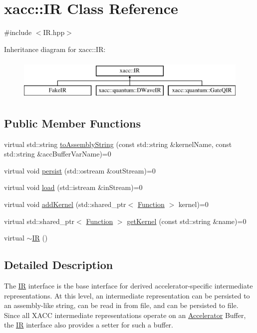 \hypertarget{a02480}{}\section{xacc\+:\+:IR Class Reference}
\label{a02480}


{\ttfamily \#include $<$I\+R.\+hpp$>$}

Inheritance diagram for xacc\+:\+:IR\+:\begin{figure}[H]
\begin{center}
\leavevmode
\includegraphics[height=2.000000cm]{a02480}
\end{center}
\end{figure}
\subsection*{Public Member Functions}
\begin{DoxyCompactItemize}
\item 
virtual std\+::string \hyperlink{a02480_a8356cdff1919b88eabeb84fd7450cdb6}{to\+Assembly\+String} (const std\+::string \&kernel\+Name, const std\+::string \&acc\+Buffer\+Var\+Name)=0
\item 
virtual void \hyperlink{a02480_a414b72224d88473ad6190bb88102a3ea}{persist} (std\+::ostream \&out\+Stream)=0
\item 
virtual void \hyperlink{a02480_a444c2e4dc0faac500fb70fa93997e9bc}{load} (std\+::istream \&in\+Stream)=0
\item 
virtual void \hyperlink{a02480_abbbf8e6993c518597de32cd05d49d737}{add\+Kernel} (std\+::shared\+\_\+ptr$<$ \hyperlink{a02456}{Function} $>$ kernel)=0
\item 
virtual std\+::shared\+\_\+ptr$<$ \hyperlink{a02456}{Function} $>$ \hyperlink{a02480_a6f49b4ba4b3a15142b04873284885f0d}{get\+Kernel} (const std\+::string \&name)=0
\item 
virtual \hyperlink{a02480_a09a76d71092254acae07e19fa2f34921}{$\sim$\+IR} ()
\end{DoxyCompactItemize}


\subsection{Detailed Description}
The \hyperlink{a02480}{IR} interface is the base interface for derived accelerator-\/specific intermediate representations. At this level, an intermediate representation can be persisted to an assembly-\/like string, can be read in from file, and can be persisted to file. Since all X\+A\+CC intermediate representations operate on an \hyperlink{a02432}{Accelerator} Buffer, the \hyperlink{a02480}{IR} interface also provides a setter for such a buffer. 

